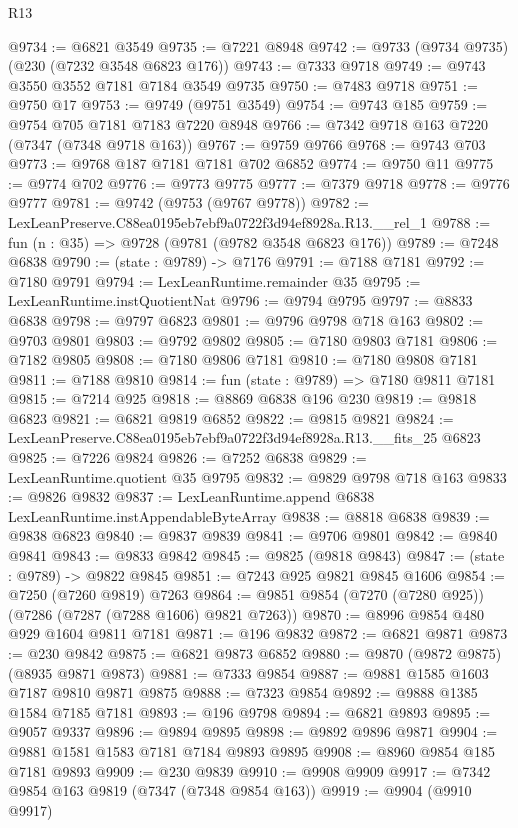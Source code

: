 \begin{lexlean}{R13}
\begin{coremodule}
@9734 := @6821 @3549
@9735 := @7221 @8948
@9742 := @9733 (@9734 @9735) (@230 (@7232 @3548 @6823 @176))
@9743 := @7333 @9718
@9749 := @9743 @3550 @3552 @7181 @7184 @3549 @9735
@9750 := @7483 @9718
@9751 := @9750 @17
@9753 := @9749 (@9751 @3549)
@9754 := @9743 @185
@9759 := @9754 @705 @7181 @7183 @7220 @8948
@9766 := @7342 @9718 @163 @7220 (@7347 (@7348 @9718 @163))
@9767 := @9759 @9766
@9768 := @9743 @703
@9773 := @9768 @187 @7181 @7181 @702 @6852
@9774 := @9750 @11
@9775 := @9774 @702
@9776 := @9773 @9775
@9777 := @7379 @9718
@9778 := @9776 @9777
@9781 := @9742 (@9753 (@9767 @9778))
@9782 := LexLeanPreserve.C88ea0195eb7ebf9a0722f3d94ef8928a.R13.__rel_1
@9788 := fun (n : @35) => @9728 (@9781 (@9782 @3548 @6823 @176))
@9789 := @7248 @6838
@9790 := (state : @9789) -> @7176
@9791 := @7188 @7181
@9792 := @7180 @9791
@9794 := LexLeanRuntime.remainder @35
@9795 := LexLeanRuntime.instQuotientNat
@9796 := @9794 @9795
@9797 := @8833 @6838
@9798 := @9797 @6823
@9801 := @9796 @9798 @718 @163
@9802 := @9703 @9801
@9803 := @9792 @9802
@9805 := @7180 @9803 @7181
@9806 := @7182 @9805
@9808 := @7180 @9806 @7181
@9810 := @7180 @9808 @7181
@9811 := @7188 @9810
@9814 := fun (state : @9789) => @7180 @9811 @7181
@9815 := @7214 @925
@9818 := @8869 @6838 @196 @230
@9819 := @9818 @6823
@9821 := @6821 @9819 @6852
@9822 := @9815 @9821
@9824 := LexLeanPreserve.C88ea0195eb7ebf9a0722f3d94ef8928a.R13.__fits_25 @6823
@9825 := @7226 @9824
@9826 := @7252 @6838
@9829 := LexLeanRuntime.quotient @35 @9795
@9832 := @9829 @9798 @718 @163
@9833 := @9826 @9832
@9837 := LexLeanRuntime.append @6838 LexLeanRuntime.instAppendableByteArray
@9838 := @8818 @6838
@9839 := @9838 @6823
@9840 := @9837 @9839
@9841 := @9706 @9801
@9842 := @9840 @9841
@9843 := @9833 @9842
@9845 := @9825 (@9818 @9843)
@9847 := (state : @9789) -> @9822 @9845
@9851 := @7243 @925 @9821 @9845 @1606
@9854 := @7250 (@7260 @9819) @7263
@9864 := @9851 @9854 (@7270 (@7280 @925)) (@7286 (@7287 (@7288 @1606) @9821 @7263))
@9870 := @8996 @9854 @480 @929 @1604 @9811 @7181
@9871 := @196 @9832
@9872 := @6821 @9871
@9873 := @230 @9842
@9875 := @6821 @9873 @6852
@9880 := @9870 (@9872 @9875) (@8935 @9871 @9873)
@9881 := @7333 @9854
@9887 := @9881 @1585 @1603 @7187 @9810 @9871 @9875
@9888 := @7323 @9854
@9892 := @9888 @1385 @1584 @7185 @7181
@9893 := @196 @9798
@9894 := @6821 @9893
@9895 := @9057 @9337
@9896 := @9894 @9895
@9898 := @9892 @9896 @9871
@9904 := @9881 @1581 @1583 @7181 @7184 @9893 @9895
@9908 := @8960 @9854 @185 @7181 @9893
@9909 := @230 @9839
@9910 := @9908 @9909
@9917 := @7342 @9854 @163 @9819 (@7347 (@7348 @9854 @163))
@9919 := @9904 (@9910 @9917)

\end{coremodule}
\end{lexlean}
